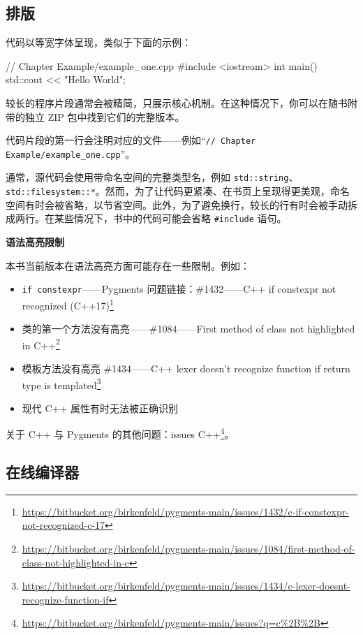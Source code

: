 \subsection{排版}

代码以等宽字体呈现，类似于下面的示例：

\begin{codebox}[cpp]
// Chapter Example/example_one.cpp
#include <iostream>
int main()
{
std::cout << "Hello World\n";
}
\end{codebox}

较长的程序片段通常会被精简，只展示核心机制。在这种情况下，你可以在随书附带的独立 ZIP 包中找到它们的完整版本。

代码片段的第一行会注明对应的文件——例如“\texttt{// Chapter Example/example\_one.cpp}”。

通常，源代码会使用带命名空间的完整类型名，例如 \texttt{std::string}、\texttt{std::filesystem::*}。然而，为了让代码更紧凑、在书页上呈现得更美观，命名空间有时会被省略，以节省空间。此外，为了避免换行，较长的行有时会被手动拆成两行。在某些情况下，书中的代码可能会省略 \texttt{\#include} 语句。

\textbf{语法高亮限制}

本书当前版本在语法高亮方面可能存在一些限制。例如：

\begin{itemize}
  \item \texttt{if constexpr}——Pygments 问题链接：\#1432——C++ if constexpr not recognized (C++17)\footnote{\url{https://bitbucket.org/birkenfeld/pygments-main/issues/1432/c-if-constexpr-not-recognized-c-17}}
  \item 类的第一个方法没有高亮——\#1084——First method of class not highlighted in C++\footnote{\url{https://bitbucket.org/birkenfeld/pygments-main/issues/1084/first-method-of-class-not-highlighted-in-c}}
  \item 模板方法没有高亮 \#1434——C++ lexer doesn't recognize function if return type is templated\footnote{\url{https://bitbucket.org/birkenfeld/pygments-main/issues/1434/c-lexer-doesnt-recognize-function-if}}
  \item 现代 C++ 属性有时无法被正确识别
\end{itemize}

关于 C++ 与 Pygments 的其他问题：issues C++\footnote{\url{https://bitbucket.org/birkenfeld/pygments-main/issues?q=c\%2B\%2B}}。

\subsection{在线编译器}

